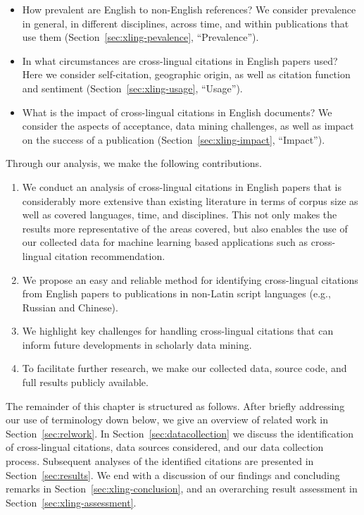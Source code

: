 \begin{itemize}
\item How prevalent are English to non-English references? We consider prevalence in general, in different disciplines, across time, and within publications that use them (Section~\ref{sec:xling-pevalence}, ``Prevalence'').
\item In what circumstances are cross-lingual citations in English papers used? Here we consider self-citation, geographic origin, as well as citation function and sentiment (Section~\ref{sec:xling-usage}, ``Usage'').
\item What is the impact of cross-lingual citations in English documents? We consider the aspects of acceptance, data mining challenges, as well as impact on the success of a publication (Section~\ref{sec:xling-impact}, ``Impact'').
\end{itemize}

\noindent Through our analysis, we make the following contributions.

\begin{enumerate}
\item We conduct an analysis of cross-lingual citations in English papers that is considerably more extensive than existing literature in terms of corpus size as well as covered languages, time, and disciplines. This not only makes the results more representative of the areas covered, but also enables the use of our collected data for machine learning based applications such as cross-lingual citation recommendation.
\item We propose an easy and reliable method for identifying cross-lingual citations from English papers to publications in non-Latin script languages (e.g., Russian and Chinese).
\item We highlight key challenges for handling cross-lingual citations that can inform future developments in scholarly data mining.
\item To facilitate further research, we make our collected data, source code, and full results publicly available.
\end{enumerate}

The remainder of this chapter is structured as follows. After briefly addressing our use of terminology down below, we give an overview of related work in Section~\ref{sec:relwork}. In Section~\ref{sec:datacollection} we discuss the identification of cross-lingual citations, data sources considered, and our data collection process. Subsequent analyses of the identified citations are presented in Section~\ref{sec:results}. We end with a discussion of our findings and concluding remarks in Section~\ref{sec:xling-conclusion}, and an overarching result assessment in Section~\ref{sec:xling-assessment}.

